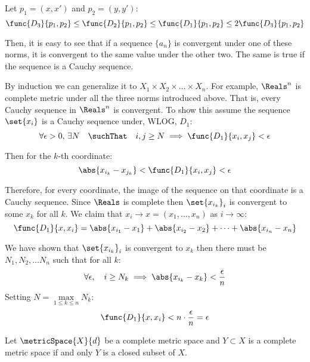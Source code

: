 Let \(p_1 = (x,x')\) and \(p_2 = (y,y')\):
\begin{equation*}
    \func{D_3}{p_1,p_2} \leq \func{D_2}{p_1,p_2} \leq \func{D_1}{p_1,p_2} \leq 2\func{D_3}{p_1,p_2} 
\end{equation*}

Then, it is easy to see that if a sequence \(\{ a_n \}\) is convergent under one of these norms, it is convergent to the same value under the other two.
The same is true if the sequence is a Cauchy sequence.

By induction we can generalize it to \(X_1 \times X_2 \times \dots \times X_n\). For example, \(\Reals^n\) is complete metric under all the three norms introduced above. That is, every Cauchy sequence in \(\Reals^n\) is convergent. To show this assume the sequence \(\set{ x_i }\) is a Cauchy sequence under, WLOG, \(D_1\):
\begin{equation*}
    \forall \epsilon > 0, \, \exists N \quad \suchThat \quad i,j \geq N \implies \func{D_1}{x_i,x_j} < \epsilon 
\end{equation*}

Then for the \(k\)-th coordinate:
\begin{equation*}
    \abs{x_{i_k} - x_{j_k}}  < \func{D_1}{x_i,x_j}  < \epsilon 
\end{equation*}

Therefore, for every coordinate, the image of the sequence on that coordinate is a Cauchy sequence. Since \(\Reals\) is complete then \(\set{ x_{i_k} } _i\) is convergent to some \(x_k\) for all \(k\). We claim that \(x_i \to x = (x_1, \dots, x_n)\) as \(i \to \infty\):
\begin{equation*}
    \func{D_1}{x,x_i} = \abs{x_{i_1} - x_1} + \abs{x_{i_2} - x_2}  + \dots + \abs{x_{i_n} - x_n} 
\end{equation*}

We have shown that \(\set{ x_{i_k}} _i\) is convergent to \(x_k\) then there must be \(N_1,N_2, \dots N_n\) such that for all \(k\):
\begin{equation*}
    \forall \epsilon,\quad i \geq N_k \implies \abs{x_{i_k} - x_k} < \frac{\epsilon}{n}
\end{equation*}
Setting \( N = \underset{1 \leq k \leq n}{\max}{N_k} \):
\begin{equation*}
    \func{D_1}{x,x_i} < n \cdot \frac{\epsilon}{n} = \epsilon
\end{equation*}

\begin{theorem}
    Let \(\metricSpace{X}{d}\) be a complete metric space and \(Y \subset X\) is a complete metric space if and only \(Y\) is a closed subset of \(X\).
\end{theorem}

